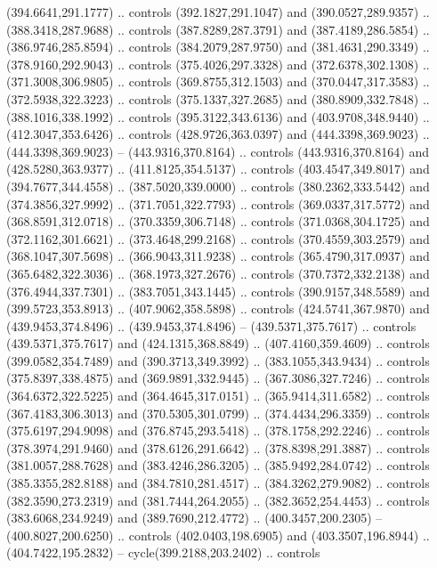 \begin{scope}[cm={{1.25,0.0,0.0,-1.25,(0.0,743.43331)}}]
    (394.6641,291.1777) .. controls (392.1827,291.1047) and (390.0527,289.9357) ..
    (388.3418,287.9688) .. controls (387.8289,287.3791) and (387.4189,286.5854) ..
    (386.9746,285.8594) .. controls (384.2079,287.9750) and (381.4631,290.3349) ..
    (378.9160,292.9043) .. controls (375.4026,297.3328) and (372.6378,302.1308) ..
    (371.3008,306.9805) .. controls (369.8755,312.1503) and (370.0447,317.3583) ..
    (372.5938,322.3223) .. controls (375.1337,327.2685) and (380.8909,332.7848) ..
    (388.1016,338.1992) .. controls (395.3122,343.6136) and (403.9708,348.9440) ..
    (412.3047,353.6426) .. controls (428.9726,363.0397) and (444.3398,369.9023) ..
    (444.3398,369.9023) -- (443.9316,370.8164) .. controls (443.9316,370.8164) and
    (428.5280,363.9377) .. (411.8125,354.5137) .. controls (403.4547,349.8017) and
    (394.7677,344.4558) .. (387.5020,339.0000) .. controls (380.2362,333.5442) and
    (374.3856,327.9992) .. (371.7051,322.7793) .. controls (369.0337,317.5772) and
    (368.8591,312.0718) .. (370.3359,306.7148) .. controls (371.0368,304.1725) and
    (372.1162,301.6621) .. (373.4648,299.2168) .. controls (370.4559,303.2579) and
    (368.1047,307.5698) .. (366.9043,311.9238) .. controls (365.4790,317.0937) and
    (365.6482,322.3036) .. (368.1973,327.2676) .. controls (370.7372,332.2138) and
    (376.4944,337.7301) .. (383.7051,343.1445) .. controls (390.9157,348.5589) and
    (399.5723,353.8913) .. (407.9062,358.5898) .. controls (424.5741,367.9870) and
    (439.9453,374.8496) .. (439.9453,374.8496) -- (439.5371,375.7617) .. controls
    (439.5371,375.7617) and (424.1315,368.8849) .. (407.4160,359.4609) .. controls
    (399.0582,354.7489) and (390.3713,349.3992) .. (383.1055,343.9434) .. controls
    (375.8397,338.4875) and (369.9891,332.9445) .. (367.3086,327.7246) .. controls
    (364.6372,322.5225) and (364.4645,317.0151) .. (365.9414,311.6582) .. controls
    (367.4183,306.3013) and (370.5305,301.0799) .. (374.4434,296.3359) .. controls
    (375.6197,294.9098) and (376.8745,293.5418) .. (378.1758,292.2246) .. controls
    (378.3974,291.9460) and (378.6126,291.6642) .. (378.8398,291.3887) .. controls
    (381.0057,288.7628) and (383.4246,286.3205) .. (385.9492,284.0742) .. controls
    (385.3355,282.8188) and (384.7810,281.4517) .. (384.3262,279.9082) .. controls
    (382.3590,273.2319) and (381.7444,264.2055) .. (382.3652,254.4453) .. controls
    (383.6068,234.9249) and (389.7690,212.4772) .. (400.3457,200.2305) --
    (400.8027,200.6250) .. controls (402.0403,198.6905) and (403.3507,196.8944) ..
    (404.7422,195.2832) -- cycle(399.2188,203.2402) .. controls

\end{scope}
